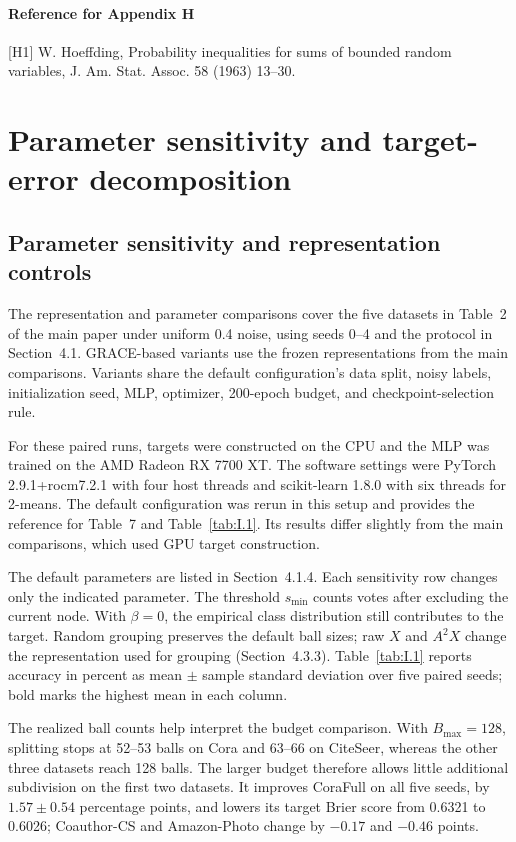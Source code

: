 \documentclass[10pt,letterpaper,nopreprintline]{elsarticle}
\begin{document}
\paragraph{Reference for Appendix H}
[H1] W. Hoeffding, Probability inequalities for sums of bounded random variables, J. Am. Stat. Assoc. 58 (1963) 13--30.

\FloatBarrier
\setcounter{table}{0}
\section{Parameter sensitivity and target-error decomposition}\label{sec:I}

\subsection{Parameter sensitivity and representation controls}\label{sec:I.1}

The representation and parameter comparisons cover the five datasets in Table~2 of the main paper under uniform 0.4 noise, using seeds 0--4 and the protocol in Section~4.1. GRACE-based variants use the frozen representations from the main comparisons. Variants share the default configuration's data split, noisy labels, initialization seed, MLP, optimizer, 200-epoch budget, and checkpoint-selection rule.

For these paired runs, targets were constructed on the CPU and the MLP was trained on the AMD Radeon RX 7700 XT. The software settings were PyTorch 2.9.1+rocm7.2.1 with four host threads and scikit-learn 1.8.0 with six threads for 2-means. The default configuration was rerun in this setup and provides the reference for Table~7 and Table~\ref{tab:I.1}. Its results differ slightly from the main comparisons, which used GPU target construction.

The default parameters are listed in Section~4.1.4. Each sensitivity row changes only the indicated parameter. The threshold \(s_{\min}\) counts votes after excluding the current node. With \(\beta=0\), the empirical class distribution still contributes to the target. Random grouping preserves the default ball sizes; raw \(X\) and \(A^2X\) change the representation used for grouping (Section~4.3.3). Table~\ref{tab:I.1} reports accuracy in percent as mean \(\pm\) sample standard deviation over five paired seeds; bold marks the highest mean in each column.



The realized ball counts help interpret the budget comparison. With \(B_{\max}=128\), splitting stops at 52--53 balls on Cora and 63--66 on CiteSeer, whereas the other three datasets reach 128 balls. The larger budget therefore allows little additional subdivision on the first two datasets. It improves CoraFull on all five seeds, by \(1.57\pm0.54\) percentage points, and lowers its target Brier score from 0.6321 to 0.6026; Coauthor-CS and Amazon-Photo change by \(-0.17\) and \(-0.46\) points.
\end{document}

